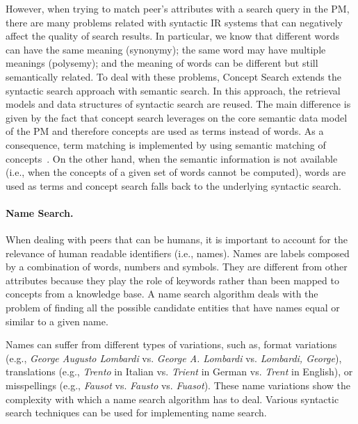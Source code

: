 However, when trying to match peer's attributes with a search query in the PM, there are many problems related with syntactic IR systems that can negatively affect the quality of search results. In particular, we know that different words can have the same meaning (synonymy); the same word may have multiple meanings (polysemy); and the meaning of words can be different but still semantically related. To deal with these problems, Concept Search extends the syntactic search approach with semantic search. In this approach, the retrieval models and data structures of syntactic search are reused. The main difference is given by the fact that concept search leverages on the core semantic data model of the PM and therefore concepts are used as terms instead of words. As a consequence, term matching is implemented by using semantic matching of concepts~\cite{Giunchiglia:2007ve}. On the other hand, when the semantic information is not available (i.e., when the concepts of a given set of words cannot be computed), words are used as terms and concept search falls back to the underlying syntactic search.


\paragraph{Name Search.} 
\label{par:name_search}
When dealing with peers that can be humans, it is important to account for the relevance of human readable identifiers (i.e., names). 
Names are labels composed by a combination of words, numbers and symbols. They are different from other attributes because they play the role of keywords rather than been mapped to concepts from a knowledge base. 
A name search algorithm deals with the problem of finding all the possible candidate entities that have names equal or similar to a given name.

Names can suffer from different types of variations, such as, format variations (e.g., \emph{George Augusto Lombardi} vs. \emph{George A. Lombardi} vs. \emph{Lombardi, George}), translations (e.g., \emph{Trento} in Italian vs. \emph{Trient} in German vs. \emph{Trent} in English), or misspellings (e.g., \emph{Fausot} vs. \emph{Fausto} vs. \emph{Fuasot}). These name variations show the complexity with which a name search algorithm has to deal. Various syntactic search techniques can be used for implementing name search. 

